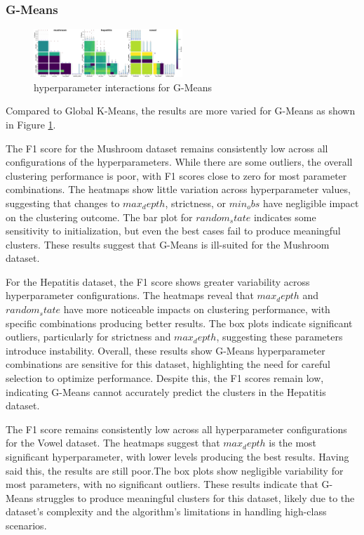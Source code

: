\subsubsection{G-Means}
\label{subsec:gmeansresults}

\begin{figure}[h!]
    \centering
    \includegraphics[width=0.5\textwidth]{figures/interactions_gmeans.png}
    \caption{hyperparameter interactions for G-Means}
    \label{fig:interactions_gmeans}
\end{figure}

Compared to Global K-Means, the results are more varied for G-Means as shown in Figure \ref{fig:interactions_gmeans}.

The F1 score for the Mushroom dataset remains consistently low across all configurations of the hyperparameters.
While there are some outliers, the overall clustering performance is poor, with F1 scores close to zero for most parameter combinations.
The heatmaps show little variation across hyperparameter values, suggesting that changes to $max_depth$, strictness, or $min_obs$ have
negligible impact on the clustering outcome. The bar plot for $random_state$ indicates some sensitivity to initialization, but even
the best cases fail to produce meaningful clusters. These results suggest that G-Means is ill-suited for the Mushroom dataset.

For the Hepatitis dataset, the F1 score shows greater variability across hyperparameter configurations. The heatmaps reveal that
$max_depth$ and $random_state$ have more noticeable impacts on clustering performance, with specific combinations producing
better results. The box plots indicate significant outliers, particularly for strictness and $max_depth$, suggesting these parameters
introduce instability. Overall, these results show G-Means hyperparameter combinations are sensitive for this dataset,
highlighting the need for careful selection to optimize performance. Despite this, the F1 scores remain low, indicating G-Means
cannot accurately predict the clusters in the Hepatitis dataset.

The F1 score remains consistently low across all hyperparameter configurations for the Vowel dataset.
The heatmaps suggest that $max_depth$ is the most significant hyperparameter, with lower levels producing the best results.
Having said this, the results are still poor.The box plots show negligible variability for most parameters, with no significant outliers. 
These results indicate that G-Means struggles to produce meaningful clusters for this dataset, 
likely due to the dataset's complexity and the algorithm's limitations in handling high-class scenarios.
